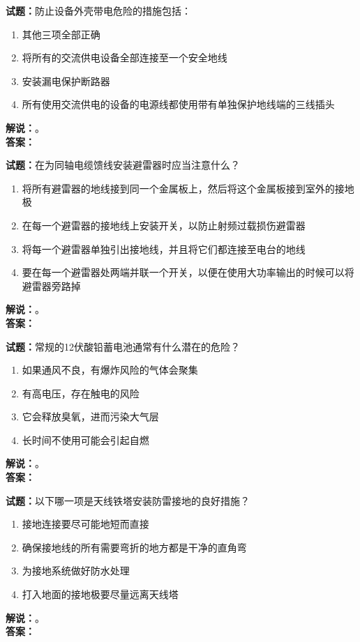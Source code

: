 \documentclass{ctexbook}
\begin{document}
\bigskip




\noindent\textbf{试题：}防止设备外壳带电危险的措施包括：
\begin{enumerate}[leftmargin=3em]
\item 其他三项全部正确
\item 将所有的交流供电设备全部连接至一个安全地线
\item 安装漏电保护断路器
\item 所有使用交流供电的设备的电源线都使用带有单独保护地线端的三线插头
\end{enumerate}
\noindent\textbf{解说：}\textbf{}。\\\noindent\textbf{答案：}

\bigskip




\noindent\textbf{试题：}在为同轴电缆馈线安装避雷器时应当注意什么？
\begin{enumerate}[leftmargin=3em]
\item 将所有避雷器的地线接到同一个金属板上，然后将这个金属板接到室外的接地极
\item 在每一个避雷器的接地线上安装开关，以防止射频过载损伤避雷器
\item 将每一个避雷器单独引出接地线，并且将它们都连接至电台的地线
\item 要在每一个避雷器处两端并联一个开关，以便在使用大功率输出的时候可以将避雷器旁路掉
\end{enumerate}
\noindent\textbf{解说：}\textbf{}。\\\noindent\textbf{答案：}

\bigskip




\noindent\textbf{试题：}常规的12伏酸铅蓄电池通常有什么潜在的危险？
\begin{enumerate}[leftmargin=3em]
\item 如果通风不良，有爆炸风险的气体会聚集
\item 有高电压，存在触电的风险
\item 它会释放臭氧，进而污染大气层
\item 长时间不使用可能会引起自燃
\end{enumerate}
\noindent\textbf{解说：}\textbf{}。\\\noindent\textbf{答案：}

\bigskip




\noindent\textbf{试题：}以下哪一项是天线铁塔安装防雷接地的良好措施？
\begin{enumerate}[leftmargin=3em]
\item 接地连接要尽可能地短而直接
\item 确保接地线的所有需要弯折的地方都是干净的直角弯
\item 为接地系统做好防水处理
\item 打入地面的接地极要尽量远离天线塔
\end{enumerate}
\noindent\textbf{解说：}\textbf{}。\\\noindent\textbf{答案：}
\end{document}
